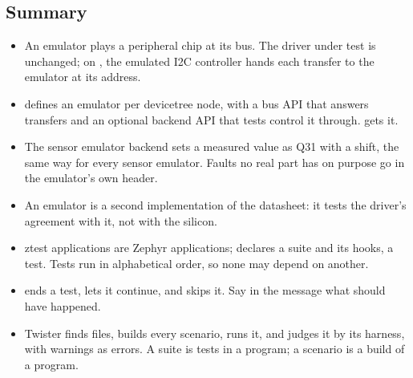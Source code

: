 \subsection{Summary}
\begin{itemize}
  \item An emulator plays a peripheral chip at its bus. The driver under test is unchanged; on
    , the emulated I2C controller hands each transfer to the emulator at its address.
  \item {} defines an emulator per devicetree node, with a bus API that answers
    transfers and an optional backend API that tests control it through.  gets it.
  \item The sensor emulator backend sets a measured value as Q31 with a shift, the same way for every sensor
    emulator. Faults no real part has on purpose go in the emulator’s own header.
  \item An emulator is a second implementation of the datasheet: it tests the driver’s agreement with it,
    not with the silicon.
  \item ztest applications are Zephyr applications;  declares a suite and its hooks,
     a test. Tests run in alphabetical order, so none may depend on another.
  \item {} ends a test,  lets it continue, and  skips it. Say
    in the message what should have happened.
  \item Twister finds  files, builds every scenario, runs it, and judges it by its
    harness, with warnings as errors. A suite is tests in a program; a scenario is a build of a program.
\end{itemize}
